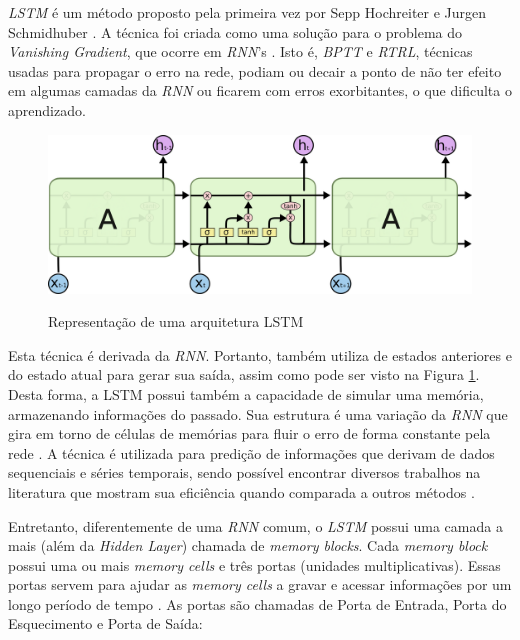 \textit{\acrshort{LSTM}} é um método proposto pela primeira vez por Sepp Hochreiter e Jurgen Schmidhuber \cite{doi:10.1162/neco.1997.9.8.1735}. A técnica foi criada como uma solução para o problema do \textit{Vanishing Gradient}, que ocorre em \textit{\acrshort{RNN}}'s \cite{doi:10.1162/neco.1997.9.8.1735}. Isto é, \textit{\acrfull{BPTT}} e \textit{\acrfull{RTRL}}, técnicas usadas para propagar o erro na rede, podiam ou decair a ponto de não ter efeito em algumas camadas da \textit{\acrshort{RNN}} ou ficarem com erros exorbitantes, o que dificulta o aprendizado. 

\begin{figure}[htbp]
    \centering
    \includegraphics[scale=0.4]{monography/img/models/lstm3.png}
    \label{figure:lstm}
    \caption[Representação de uma arquitetura LSTM]{Representação de uma arquitetura LSTM\footnotemark}
\end{figure}

Esta técnica é derivada da \textit{\acrshort{RNN}}. Portanto, também utiliza de estados anteriores e do estado atual para gerar sua saída, assim como pode ser visto na Figura \ref{figure:lstm}. Desta forma, a \acrshort{LSTM} possui também a capacidade de simular uma memória, armazenando informações do passado. Sua estrutura é uma variação da \textit{\acrshort{RNN}} que gira em torno de células de memórias para fluir o erro de forma constante pela rede \cite{doi:10.1162/neco.1997.9.8.1735}. A técnica é utilizada para predição de informações que derivam de dados sequenciais e séries temporais, sendo possível encontrar diversos trabalhos na literatura que mostram sua eficiência quando comparada a outros métodos \cite{alex2012}.

Entretanto, diferentemente de uma \textit{\acrshort{RNN}} comum, o \textit{\acrshort{LSTM}} possui uma camada a mais (além da \textit{Hidden Layer}) chamada de \textit{memory blocks}. Cada \textit{memory block} possui uma ou mais \textit{memory cells} e três portas (unidades multiplicativas). Essas portas servem para ajudar as \textit{memory cells} a gravar e acessar informações por um longo período de tempo \cite{alex2012}. As portas são chamadas de Porta de Entrada, Porta do Esquecimento e Porta de Saída:

